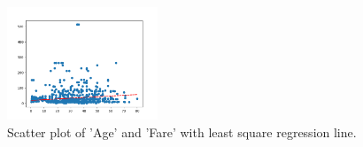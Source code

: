 \documentclass[12pt]{article}
\begin{document}
\begin{figure}[ht!]
    \centering
    \includegraphics[width=0.4\textwidth]{figs/figure_8.png}
    \caption{Scatter plot of 'Age' and 'Fare' with least square regression line.}
\end{figure}
\end{document}
